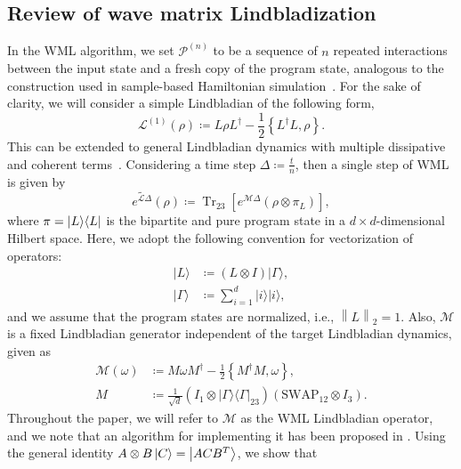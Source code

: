\documentclass[superscriptaddress,amsmath,amssymb,aps,pra,letterpaper,tightenlines,notitlepages,12pt]{revtex4-2}
\begin{document}
\subsection{Review of wave matrix Lindbladization}
In the WML algorithm, we set $\mathcal{P}^{(n)}$ to be a sequence of $n$ repeated interactions between the input state and a fresh copy of the program state, analogous to the construction used in sample-based Hamiltonian simulation~\cite{kimmel2017HamiltonianSimulationOptimal,wei2024SimulatingNoncompletelyPositive,go2025SamplebasedHamiltonianLindbladian}. For the sake of clarity, we will consider a simple Lindbladian of the following form,
\begin{equation}
    \label{eq:lindblad_dynamics}
    \mathcal{L}^{(1)}(\rho) \coloneqq L \rho L^\dagger - \frac{1}{2} \left\{L^\dagger L, \rho \right\}. 
\end{equation}
This can be extended to general Lindbladian dynamics with multiple dissipative and coherent terms~\cite{patel2023WaveMatrixLindbladizationa}. Considering a time step $\Delta\coloneqq \frac{t}{n}$, then a single step of WML is given by
\begin{equation}
\widetilde{e^{\mathcal{L}\Delta}}
(\rho)\coloneqq\operatorname{Tr}_{23}[e^{\mathcal{M}\Delta}  (\rho\otimes\pi_{L})],\label{eq:WML-actual-one-step}
\end{equation}
where $\pi = \ket{L} \!\bra{L}$ is the bipartite and pure program state in a $d\times
d$-dimensional Hilbert space. Here, we adopt the following convention for vectorization of operators:
\begin{align}
|{L}\rangle & \coloneqq \left(  L\otimes I\right)  |\Gamma\rangle,\\
|\Gamma\rangle & \coloneqq \sum_{i=1}^{d}|i\rangle|i\rangle,
\end{align}
and we assume that the program states are normalized, i.e., $\left\| L\right\|_2=1$. Also, ${\mathcal{M}}$ is a fixed Lindbladian generator independent of the target Lindbladian dynamics, given as
\begin{align}
\mathcal{M}(\omega)  & \coloneqq M\omega M^{\dag}-\frac{1}{2}\left\{  M^{\dag} M,\omega\right\}  , \label{eq:WML-M-op} \\
M  & \coloneqq \frac{1}{\sqrt{d}} \left(  I_{1}\otimes|\Gamma\rangle\!\langle\Gamma|_{23}\right)  \left(
\mathrm{SWAP}_{12}\otimes I_{3}\right). \label{eq:WML-M-jump}
\end{align}
Throughout the paper, we will refer to $\mathcal{M}$ as the WML Lindbladian operator, and we note that an algorithm for implementing it has been proposed in \cite{sims2025DigitalQuantumSimulations}. Using the general identity $A\otimes B\ket{C} = \ket{ACB^T}$, we show that 
\end{document}
